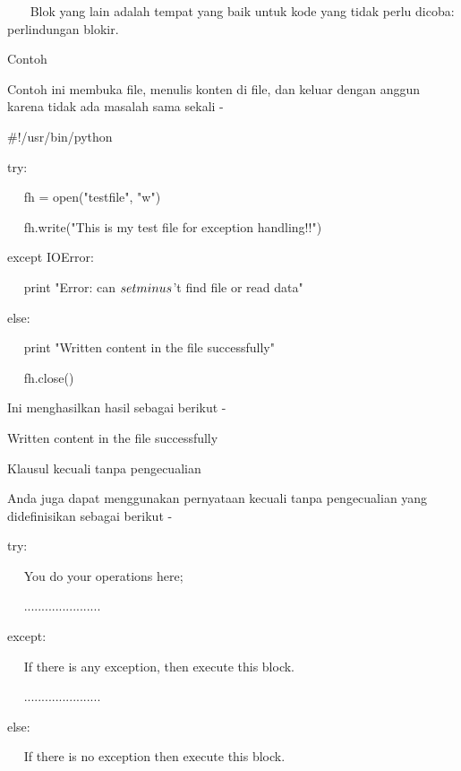 \vspace{12pt}
~~~ Blok yang lain adalah tempat yang baik untuk kode yang tidak perlu dicoba: perlindungan blokir. \par
\vspace{12pt}
Contoh \par
\vspace{12pt}
Contoh ini membuka file, menulis konten di file, dan keluar dengan anggun karena tidak ada masalah sama sekali - \par
\vspace{12pt}
 $  \#  $!/usr/bin/python \par
\vspace{12pt}
try: \par
~~ fh = open("testfile", "w") \par
~~ fh.write("This is my test file for exception handling!!") \par
except IOError: \par
~~ print "Error: can $  \\setminus  $'t find file or read data" \par
else: \par
~~ print "Written content in the file successfully" \par
~~ fh.close() \par
\vspace{12pt}
Ini menghasilkan hasil sebagai berikut - \par
\vspace{12pt}
Written content in the file successfully \par
\vspace{12pt}
Klausul kecuali tanpa pengecualian \par
\vspace{12pt}
Anda juga dapat menggunakan pernyataan kecuali tanpa pengecualian yang didefinisikan sebagai berikut - \par
\vspace{12pt}
try: \par
~~ You do your operations here; \par
~~ ...................... \par
except: \par
~~ If there is any exception, then execute this block. \par
~~ ...................... \par
else: \par
~~ If there is no exception then execute this block.  \par
\vspace{12pt}
